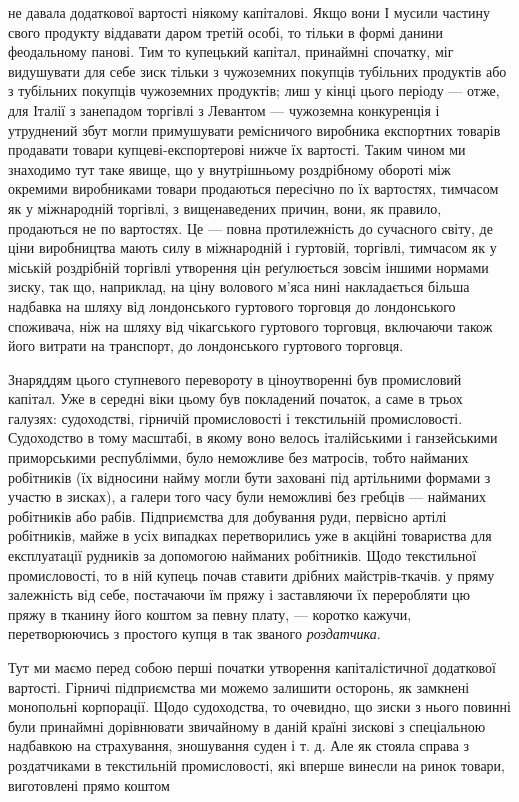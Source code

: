 \parcont{}  %
не давала додаткової вартості ніякому капіталові. Якщо вони І мусили частину свого продукту віддавати даром третій особі, то
тільки в формі данини феодальному панові. Тим то купецький капітал, принаймні спочатку, міг видушувати для себе зиск тільки
з чужоземних покупців тубільних продуктів або з тубільних покупців чужоземних продуктів; лиш у кінці цього періоду — отже,
для Італії з занепадом торгівлі з Левантом — чужоземна конкуренція і утруднений збут могли примушувати ремісничого виробника
експортних товарів продавати товари купцеві-експортерові нижче їх вартості. Таким чином ми знаходимо тут таке явище, що у
внутрішньому роздрібному обороті між окремими виробниками товари продаються пересічно по їх вартостях, тимчасом як у
міжнародній торгівлі, з вищенаведених причин, вони, як правило, продаються не по вартостях. Це — повна протилежність до
сучасного світу, де ціни виробництва мають силу в міжнародній і гуртовій, торгівлі, тимчасом як у міській роздрібній
торгівлі утворення цін реґулюється зовсім іншими нормами зиску, так що, наприклад, на ціну волового м’яса нині накладається
більша надбавка на шляху від лондонського гуртового торговця до лондонського споживача, ніж на шляху від чікагського
гуртового торговця, включаючи також його витрати на транспорт, до лондонського гуртового торговця.

Знаряддям цього
ступневого перевороту в ціноутворенні був промисловий капітал. Уже в середні віки цьому був покладений початок, а саме в
трьох галузях: судоходстві, гірничій промисловості і текстильній промисловості. Судоходство в тому масштабі, в якому воно
велось італійськими і ганзейськими приморськими республімми, було неможливе без матросів, тобто найманих робітників (їх
відносини найму могли бути заховані під артільними формами з участю в зисках), а галери того часу були неможливі без гребців
— найманих робітників або рабів. Підприємства для добування руди, первісно артілі робітників, майже в усіх випадках
перетворились уже в акційні товариства для експлуатації рудників за допомогою найманих робітників. Щодо текстильної
промисловості, то в ній купець почав ставити дрібних майстрів-ткачів. у пряму залежність від себе, постачаючи їм пряжу і
заставляючи їх переробляти цю пряжу в тканину його коштом за певну плату, — коротко кажучи, перетворюючись з простого купця
в так званого \emph{роздатчика}.

Тут ми маємо перед собою перші початки утворення капіталістичної додаткової вартості. Гірничі
підприємства ми можемо залишити осторонь, як замкнені монопольні корпорації. Щодо судоходства, то очевидно, що зиски з нього
повинні були принаймні дорівнювати звичайному в даній країні зискові з спеціальною надбавкою на страхування, зношування
суден і т. д. Але як стояла справа з роздатчиками в текстильній промисловості, які вперше винесли на ринок товари,
виготовлені прямо коштом
\parbreak{}  %

